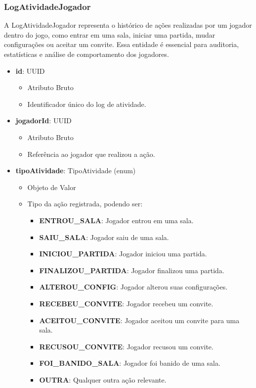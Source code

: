     \subsubsection{LogAtividadeJogador}
    A LogAtividadeJogador representa o histórico de ações realizadas por um jogador dentro do jogo, como entrar em uma sala, iniciar uma partida, mudar configurações ou aceitar um convite. Essa entidade é essencial para auditoria, estatísticas e análise de comportamento dos jogadores.
    \begin{itemize}
        \item \textbf{id}: UUID  
              \begin{itemize}
                  \item Atributo Bruto
                  \item Identificador único do log de atividade.
              \end{itemize}
    
        \item \textbf{jogadorId}: UUID  
              \begin{itemize}
                  \item Atributo Bruto
                  \item Referência ao jogador que realizou a ação.
              \end{itemize}
    
        \item \textbf{tipoAtividade}: TipoAtividade (enum)  
              \begin{itemize}
                  \item Objeto de Valor
                  \item Tipo da ação registrada, podendo ser:
                  \begin{itemize}
                      \item \textbf{ENTROU\_SALA}: Jogador entrou em uma sala.
                      \item \textbf{SAIU\_SALA}: Jogador saiu de uma sala.
                      \item \textbf{INICIOU\_PARTIDA}: Jogador iniciou uma partida.
                      \item \textbf{FINALIZOU\_PARTIDA}: Jogador finalizou uma partida.
                      \item \textbf{ALTEROU\_CONFIG}: Jogador alterou suas configurações.
                      \item \textbf{RECEBEU\_CONVITE}: Jogador recebeu um convite.
                      \item \textbf{ACEITOU\_CONVITE}: Jogador aceitou um convite para uma sala.
                      \item \textbf{RECUSOU\_CONVITE}: Jogador recusou um convite.
                      \item \textbf{FOI\_BANIDO\_SALA}: Jogador foi banido de uma sala.
                      \item \textbf{OUTRA}: Qualquer outra ação relevante.
                  \end{itemize}
              \end{itemize}
    

\end{itemize}
